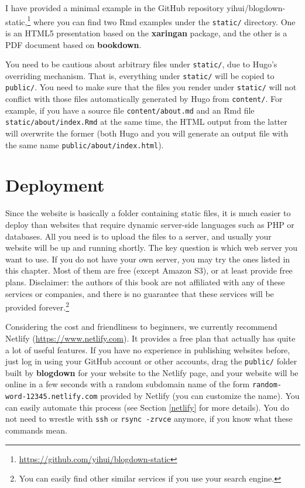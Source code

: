 \documentclass[12pt,]{krantz}
\renewcommand{\href}[2]{#2\footnote{\url{#1}}}
\theoremstyle{definition}
\theoremstyle{definition}
\theoremstyle{definition}
\theoremstyle{remark}
\begin{document}
I have provided a minimal example in the GitHub repository
\href{https://github.com/yihui/blogdown-static}{yihui/blogdown-static,}
where you can find two Rmd examples under the \texttt{static/}
directory. One is an HTML5 presentation based on the \textbf{xaringan}
package, and the other is a PDF document based on \textbf{bookdown}.

You need to be cautious about arbitrary files under \texttt{static/},
due to Hugo's overriding mechanism. That is, everything under
\texttt{static/} will be copied to \texttt{public/}. You need to make
sure that the files you render under \texttt{static/} will not conflict
with those files automatically generated by Hugo from \texttt{content/}.
For example, if you have a source file \texttt{content/about.md} and an
Rmd file \texttt{static/about/index.Rmd} at the same time, the HTML
output from the latter will overwrite the former (both Hugo and you will
generate an output file with the same name
\texttt{public/about/index.html}).

\chapter{Deployment}\label{deployment}

Since the website is basically a folder containing static files, it is
much easier to deploy than websites that require dynamic server-side
languages such as PHP or databases. All you need is to upload the files
to a server, and usually your website will be up and running shortly.
The key question is which web server you want to use. If you do not have
your own server, you may try the ones listed in this chapter. Most of
them are free (except Amazon S3), or at least provide free plans.
Disclaimer: the authors of this book are not affiliated with any of
these services or companies, and there is no guarantee that these
services will be provided forever.\footnote{You can easily find other
  similar services if you use your search engine.}

Considering the cost and friendliness to beginners, we currently
recommend Netlify (\url{https://www.netlify.com}). It provides a free
plan that actually has quite a lot of useful features. If you have no
experience in publishing websites before, just log in using your GitHub
account or other accounts, drag the \texttt{public/} folder built by
\textbf{blogdown} for your website to the Netlify page, and your website
will be online in a few seconds with a random subdomain name of the form
\texttt{random-word-12345.netlify.com} provided by Netlify (you can
customize the name). You can easily automate this process (see Section
\ref{netlify} for more details). You do not need to wrestle with
\texttt{ssh} or \texttt{rsync\ -zrvce} anymore, if you know what these
commands mean.
\end{document}
